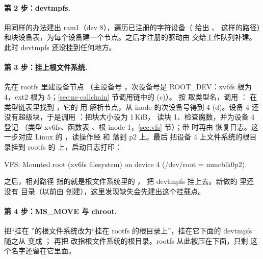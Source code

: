 \paragraph{第 2 步：devtmpfs.}  用同样的办法建出 ram1（dev 8），遍历已注册的字符设备（ 给出 、 这样的路径）和块设备表，为每个设备建一个节点。之后才注册的驱动由  交给工作队列补建。此时 devtmpfs 还没挂到任何地方。

\paragraph{第 3 步：挂上根文件系统.} 先在 rootfs 里建设备节点 （主设备号 ，次设备号是 ROOT\_DEV：xv6fs 根为 4，ext2 根为 5；\ref{sec:ns-callchain} 节调用链中的 (c)）。 按  取类型名，调用 ： 在类型链表里找到 ，它的  用  解析节点，从 inode 的次设备号得到 4 (d)。设备 4 还没有超级块，于是调用 ：把块大小设为 1\,KiB， 读块 1、检查魔数，并为设备 4 登记 （类型 xv6fs、函数表 、根 inode 1，\ref{sec:vfs} 节）；带  时再由  恢复日志。这一步对应 Linux 的 ，读操作经  和  落到 p2 上。最后  把设备 4 上文件系统的根目录挂到 rootfs 的  上，启动日志打印：

\begin{txtcode}
VFS: Mounted root (xv6fs filesystem) on device 4 (/dev/root = mmcblk0p2).
\end{txtcode}

 之后，相对路径  指的就是根文件系统里的 ， 把 devtmpfs 挂上去。新做的  里还没有  目录（以前由  创建），这里发现缺失会先建出这个挂载点。

\paragraph{第 4 步：MS\_MOVE 与 chroot.}  把“挂在 ”的根文件系统改为“挂在 rootfs 的根目录上”，挂在它下面的 devtmpfs 随之从  变成 ； 再把 \code{/} 改指根文件系统的根目录。rootfs 从此被压在下面，只剩  这个名字还留在它里面。

